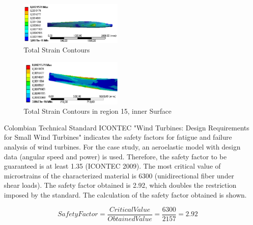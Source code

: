 \begin{figure}[H]
\begin{center}
  \includegraphics[width=0.45\textwidth]{p5}
\caption{Total Strain Contours }
\label{fig:12}       %
\end{center}
\end{figure}

\begin{figure}[H]
\begin{center}
  \includegraphics[width=0.45\textwidth]{p6}
\caption{Total Strain Contours in region 15, inner Surface  }
\label{fig:13}       %
\end{center}
\end{figure}

Colombian Technical Standard ICONTEC "Wind Turbines: Design Requirements for Small Wind Turbines" indicates the safety factors for fatigue and failure analysis of wind turbines. For the case study, an aeroelastic model with design data (angular speed and power) is used. Therefore, the safety factor to be guaranteed is at least 1.35 (ICONTEC 2009). The most critical value of microstrains of the characterized material is 6300 (unidirectional fiber under shear loads). The safety factor obtained is 2.92, which doubles the restriction imposed by the standard. The calculation of the safety factor obtained is shown.

\begin{equation}
Safety Factor= \frac{Critical Value}{Obtained Value} = \frac{6300}{2157} = 2.92
\end{equation}\\

